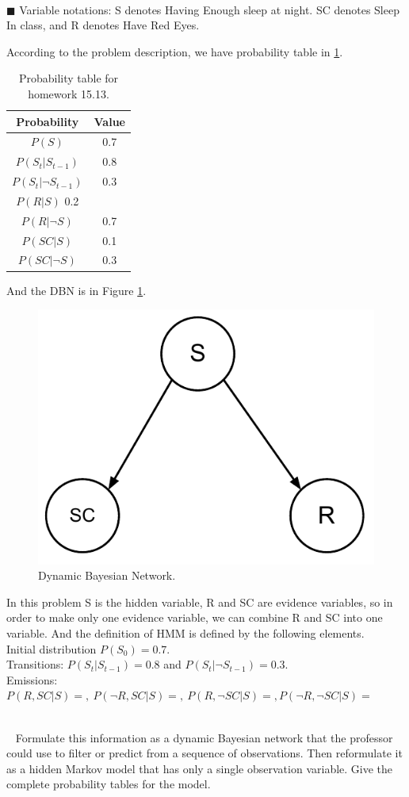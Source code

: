 \documentclass{article}
\newcommand{\solution}[1]{~\\ $\blacksquare$ \sffamily\upshape\selectfont #1
\normalfont ~\\~ }
\begin{document}
\solution{
  Variable notations: S denotes Having Enough sleep at night. SC
  denotes Sleep In class, and R denotes Have Red Eyes.

  According to the problem description, we have probability table in
  \ref{tbl:3-1}. 
  \begin{table}[h]
    \centering
    \begin{tabular}{cc}
      \toprule
      \textbf{Probability} & \textbf{Value} \\ \toprule
      $P(S)$ & 0.7 \\ \midrule
      $P(S_t|S_{t-1})$ & 0.8 \\ \midrule
      $P(S_t|\neg S_{t-1})$ & 0.3 \\ \midrule  
      $P(R|S) $ 0.2 \\ \midrule
      $P(R|\neg S)$ & 0.7 \\ \midrule
      $P(SC|S)$ & 0.1  \\ \midrule
      $P(SC|\neg S)$ & 0.3 \\ 
      \bottomrule
    \end{tabular}
    \caption{Probability table for homework 15.13.}
    \label{tbl:3-1}
  \end{table}

  And the DBN is in Figure \ref{fig:3-1}.
  \begin{figure}[ht]
    \centering
    \includegraphics[width=.5\textwidth]{AI-HWK-3_1.pdf}
    \caption{Dynamic Bayesian Network.}\label{fig:3-1}
  \end{figure}

  In this problem S is the hidden variable, R and SC are evidence
  variables, so in order to make only one evidence variable, we can
  combine R and SC into one variable. And the definition of HMM is
  defined by the following elements.  \\
  Initial distribution $P(S_0) = 0.7$. \\ 
  Transitions: $P(S_t|S_{t-1}) = 0.8$ and $P(S_t|\neg
  S_{t-1})=0.3$. \\
  Emissions: $P(R,SC|S) = ,~ P(\neg R,SC|S) = ,~ P(R,\neg SC|S) = ,
  P(\neg R, \neg SC|S) = $
 
}
Formulate this information as a dynamic Bayesian network that the
professor could use to filter or predict from a sequence of
observations. Then reformulate it as a hidden Markov model that has
only a single observation variable. Give the complete probability
tables for the model.
\end{document}
